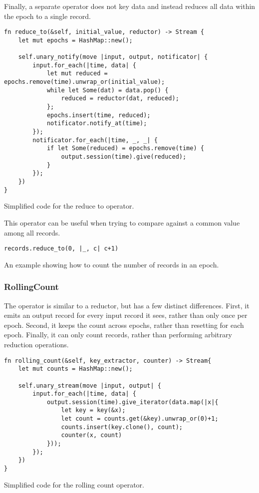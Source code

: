 Finally, a separate  operator does not key data and instead reduces all data within the epoch to a single record.

\begin{listing}[H]
\begin{verbatim}
fn reduce_to(&self, initial_value, reductor) -> Stream {
    let mut epochs = HashMap::new();
    
    self.unary_notify(move |input, output, notificator| {
        input.for_each(|time, data| {
            let mut reduced = epochs.remove(time).unwrap_or(initial_value);
            while let Some(dat) = data.pop() {
                reduced = reductor(dat, reduced);
            };
            epochs.insert(time, reduced);
            notificator.notify_at(time);
        });
        notificator.for_each(|time, _, _| {
            if let Some(reduced) = epochs.remove(time) {
                output.session(time).give(reduced);
            }
        });
    })
}
\end{verbatim}
  \caption{Simplified code for the reduce to operator.}
  \label{lst:reduce-to}
\end{listing}

This operator can be useful when trying to compare against a common value among all records.

\begin{listing}[H]
\begin{verbatim}
records.reduce_to(0, |_, c| c+1)
\end{verbatim}
\caption{An example showing how to count the number of records in an epoch.}
\label{lst:reduce-to-example}
\end{listing}

\subsubsection{RollingCount}
The  operator is similar to a reductor, but has a few distinct differences. First, it emits an output record for every input record it sees, rather than only once per epoch. Second, it keeps the count across epochs, rather than resetting for each epoch. Finally, it can only count records, rather than performing arbitrary reduction operations.

\begin{listing}[H]
\begin{verbatim}
fn rolling_count(&self, key_extractor, counter) -> Stream{
    let mut counts = HashMap::new();
    
    self.unary_stream(move |input, output| {
        input.for_each(|time, data| {
            output.session(time).give_iterator(data.map(|x|{
                let key = key(&x);
                let count = counts.get(&key).unwrap_or(0)+1;
                counts.insert(key.clone(), count);
                counter(x, count)
            }));
        });
    })
}
\end{verbatim}
  \caption{Simplified code for the rolling count operator.}
  \label{lst:rolling-count}
\end{listing}

